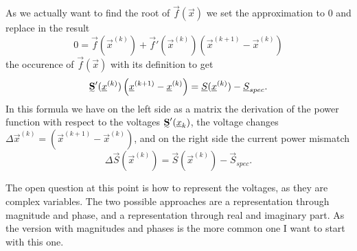 As we actually want to find the root of $\vec f (\vec x)$ we set the approximation to 0 and replace in the result
\begin{equation}
	0 = \vec f (\vec x^{(k)}) + \vec f' (\vec x^{(k)}) \left( \vec x^{(k+1)} - \vec x^{(k)} \right)
\end{equation}
the occurence of $\vec f (\vec x)$ with its definition to get
\begin{equation}
	\mat S' (\vec x^{(k)}) \left( \vec x^{(k+1)} - \vec x^{(k)} \right) = \vec S (\vec x^{(k)}) - \vec S_{spec}.
	\label{eq:newton_raphson_equation_system}
\end{equation}
In this formula we have on the left side as a matrix the derivation of the power function with respect to the voltages $\mat S' (\vec x_k)$, the voltage changes $\Delta \vec x^{(k)} = \left( \vec x^{(k+1)} - \vec x^{(k)} \right)$, and on the right side the current power mismatch 
\begin{equation}
	\Delta \vec S (\vec x^{(k)}) = \vec S (\vec x^{(k)}) - \vec S_{spec}.
	\label{eq:power_mismatch}
\end{equation}

The open question at this point is how to represent the voltages, as they are complex variables. The two possible approaches are a representation through magnitude and phase, and a representation through real and imaginary part. As the version with magnitudes and phases is the more common one I want to start with this one.

